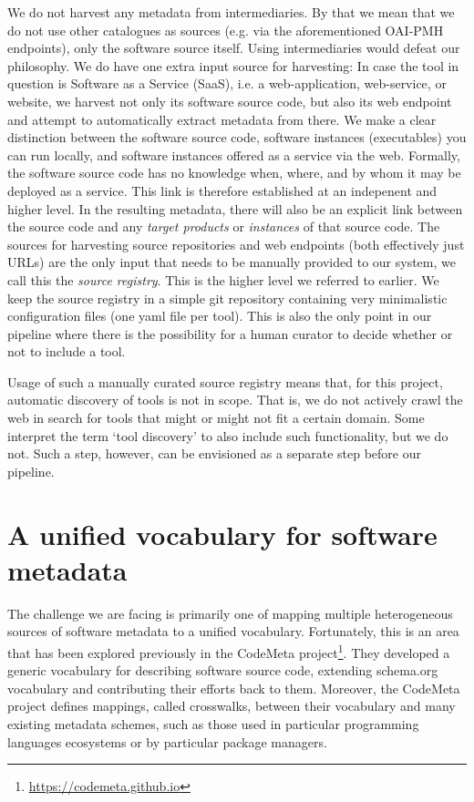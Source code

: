\documentclass[a4paper,11pt]{article}
\begin{document}
We do not harvest any metadata from intermediaries. By that we mean that we do
not use other catalogues as sources (e.g. via the aforementioned OAI-PMH
endpoints), only the software source itself. Using intermediaries would defeat
our philosophy. We do have one extra input source for harvesting: In case the
tool in question is Software as a Service (SaaS), i.e. a web-application,
web-service, or website, we harvest not only its software source code, but also
its web endpoint and attempt to automatically extract metadata from there. We
make a clear distinction between the software source code, software instances
(executables) you can run locally, and software instances offered as a service
via the web. Formally, the software source code has no knowledge when, where,
and by whom it may be deployed as a service. This link is therefore established
at an indepenent and higher level. In the resulting metadata, there will also
be an explicit link between the source code and any \emph{target products} or
\emph{instances} of that source code. The sources for harvesting source
repositories and web endpoints (both effectively just URLs) are the only input
that needs to be manually provided to our system, we call this the \emph{source
registry}. This is the higher level we referred to earlier. We keep the source
registry in a simple git repository containing very minimalistic configuration
files (one yaml file per tool). This is also the only point in our pipeline
where there is the possibility for a human curator to decide whether or not to
include a tool.

Usage of such a manually curated source registry means that, for this project,
automatic discovery of tools is not in scope. That is, we do not actively crawl
the web in search for tools that might or might not fit a certain domain. Some
interpret the term `tool discovery' to also include such functionality, but we do
not. Such a step, however, can be envisioned as a separate step before our
pipeline.

\section{A unified vocabulary for software metadata}

The challenge we are facing is primarily one of mapping multiple heterogeneous
sources of software metadata to a unified vocabulary. Fortunately, this is an
area that has been explored previously in the CodeMeta
project\footnote{\url{https://codemeta.github.io}}. They developed a generic
vocabulary for describing software source code, extending schema.org vocabulary
and contributing their efforts back to them. Moreover, the CodeMeta project
defines mappings, called crosswalks, between their vocabulary and many existing
metadata schemes, such as those used in particular programming languages
ecosystems or by particular package managers.
\end{document}
